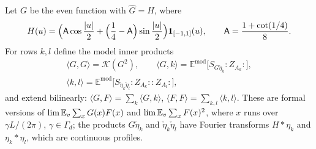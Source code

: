 \documentclass[11pt,colorlinks]{charlie}
\newcommand{\Ka}{\mathcal{K}}
\newcommand{\Wk}[1]{{:}#1{:}}
\begin{document}
Let $G$ be the even function with $\widehat G=H$, where
\begin{equation}\label{eq:H}
 H(u)=\Big(\mathsf A\cos\frac{|u|}2+\Big(\frac14-\mathsf A\Big)\sin\frac{|u|}2\Big)\mathbf{1}_{[-1,1]}(u),\qquad\mathsf A=\frac{1+\cot(1/4)}8 .
\end{equation}
For rows $k,l$ define the model inner products
\begin{gather*}
 \langle G,G\rangle=\Ka(G^2),\qquad\langle G,k\rangle=\mathbb E^{\mathrm{mod}}\big[S_{G\check\eta_k}\Wk{Z_{A_k}}\big],\\
 \langle k,l\rangle=\mathbb E^{\mathrm{mod}}\big[S_{\check\eta_k\check\eta_l}\Wk{Z_{A_k}}\Wk{Z_{A_l}}\big],
\end{gather*}
and extend bilinearly: $\langle G,F\rangle=\sum_k\langle G,k\rangle$, $\langle F,F\rangle=\sum_{k,l}\langle k,l\rangle$. These are formal versions of $\lim\mathbb{E}_v\sum_xG(x)F(x)$ and $\lim\mathbb{E}_v\sum_xF(x)^2$, where $x$ runs over $\gamma L/(2\pi)$, $\gamma\in\Gamma_d$; the products $G\check\eta_k$ and $\check\eta_k\check\eta_l$ have Fourier transforms $H*\eta_k$ and $\eta_k*\eta_l$, which are continuous profiles.
\end{document}
